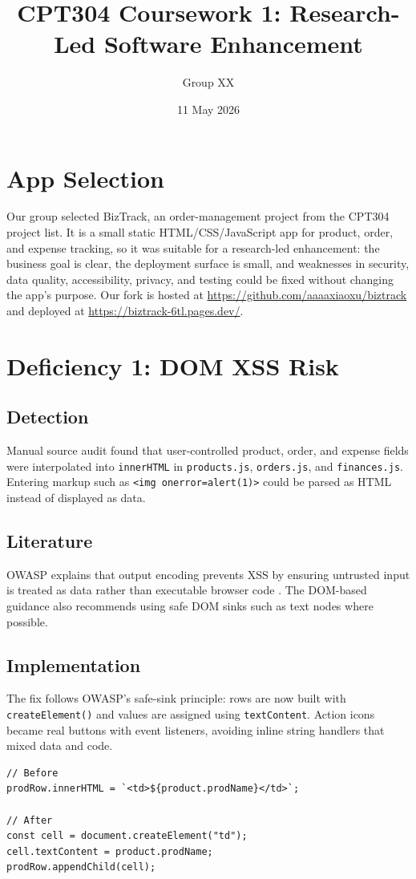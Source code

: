 \documentclass[12pt]{article}
\title{\textbf{CPT304 Coursework 1: Research-Led Software Enhancement}}
\author{Group XX}
\date{11 May 2026}
\begin{document}
\maketitle

\section{App Selection}
Our group selected BizTrack, an order-management project from the CPT304 project list. It is a small static HTML/CSS/JavaScript app for product, order, and expense tracking, so it was suitable for a research-led enhancement: the business goal is clear, the deployment surface is small, and weaknesses in security, data quality, accessibility, privacy, and testing could be fixed without changing the app's purpose. Our fork is hosted at \url{https://github.com/aaaaxiaoxu/biztrack} and deployed at \url{https://biztrack-6tl.pages.dev/}.

\section{Deficiency 1: DOM XSS Risk}
\subsection{Detection}
Manual source audit found that user-controlled product, order, and expense fields were interpolated into \texttt{innerHTML} in \texttt{products.js}, \texttt{orders.js}, and \texttt{finances.js}. Entering markup such as \texttt{<img onerror=alert(1)>} could be parsed as HTML instead of displayed as data.
\subsection{Literature}
OWASP explains that output encoding prevents XSS by ensuring untrusted input is treated as data rather than executable browser code \cite{owasp-xss}. The DOM-based guidance also recommends using safe DOM sinks such as text nodes where possible.
\subsection{Implementation}
The fix follows OWASP's safe-sink principle: rows are now built with \texttt{createElement()} and values are assigned using \texttt{textContent}. Action icons became real buttons with event listeners, avoiding inline string handlers that mixed data and code.
\begin{lstlisting}[caption={Before and after: safe table output}]
// Before
prodRow.innerHTML = `<td>${product.prodName}</td>`;

// After
const cell = document.createElement("td");
cell.textContent = product.prodName;
prodRow.appendChild(cell);
\end{lstlisting}
\end{document}
